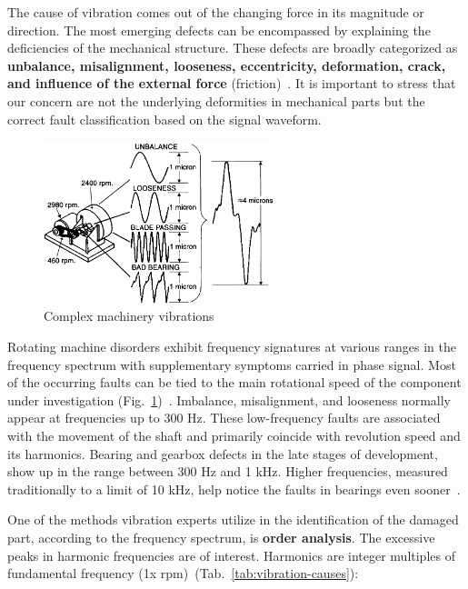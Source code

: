 The cause of vibration comes out of the changing force in its magnitude or direction. The most emerging defects can be encompassed by explaining the deficiencies of the mechanical structure. These defects are broadly categorized as \textbf{unbalance, misalignment, looseness, eccentricity, deformation, crack, and influence of the external force} (friction)~\cite{davies_handbook_2012}. It is important to stress that our concern are not the underlying deformities in mechanical parts but the correct fault classification based on the signal waveform.

\begin{figure}[ht]
	\centering
	\includegraphics[width=0.6\textwidth]{assets/analysis/complex-vibrations.png}
	\caption{Complex machinery vibrations~\cite{davies_handbook_2012}}
	\label{fig:machinery-vibrations}
\end{figure}

Rotating machine disorders exhibit frequency signatures at various ranges in the frequency spectrum with supplementary symptoms carried in phase signal. Most of the occurring faults can be tied to the main rotational speed of the component under investigation (Fig.~\ref{fig:machinery-vibrations})~\cite{davies_handbook_2012}. Imbalance, misalignment, and looseness normally appear at frequencies up to 300 Hz. These low-frequency faults are associated with the movement of the shaft and primarily coincide with revolution speed and its harmonics. Bearing and gearbox defects in the late stages of development, show up in the range between 300 Hz and 1 kHz. Higher frequencies, measured traditionally to a limit of 10 kHz, help notice the faults in bearings even sooner~\cite{torres_automatic_2022}.

One of the methods vibration experts utilize in the identification of the damaged part, according to the frequency spectrum, is \textbf{order analysis}. The excessive peaks in harmonic frequencies are of interest. Harmonics are integer multiples of fundamental frequency (1x rpm)~(Tab.~\ref{tab:vibration-causes}):

